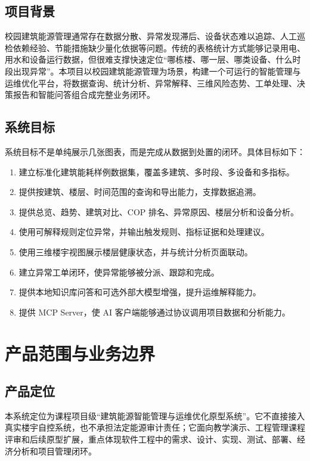 \documentclass[12pt,a4paper]{ctexart}
\begin{document}
\subsection{项目背景}
校园建筑能源管理通常存在数据分散、异常发现滞后、设备状态难以追踪、人工巡检依赖经验、节能措施缺少量化依据等问题。传统的表格统计方式能够记录用电、用水和设备运行数据，但很难支撑快速定位“哪栋楼、哪一层、哪类设备、什么时段出现异常”。本项目以校园建筑能源管理为场景，构建一个可运行的智能管理与运维优化平台，将数据查询、统计分析、异常解释、三维风险态势、工单处理、决策报告和智能问答组合成完整业务闭环。

\subsection{系统目标}
系统目标不是单纯展示几张图表，而是完成从数据到处置的闭环。具体目标如下：
\begin{enumerate}
    \item 建立标准化建筑能耗样例数据集，覆盖多建筑、多时段、多设备和多指标。
    \item 提供按建筑、楼层、时间范围的查询和导出能力，支撑数据追溯。
    \item 提供总览、趋势、建筑对比、COP 排名、异常原因、楼层分析和设备分析。
    \item 使用可解释规则定位异常，并输出触发规则、指标证据和处理建议。
    \item 使用三维楼宇视图展示楼层健康状态，并与统计分析页面联动。
    \item 建立异常工单闭环，使异常能够被分派、跟踪和完成。
    \item 提供本地知识库问答和可选外部大模型增强，提升运维解释能力。
    \item 提供 MCP Server，使 AI 客户端能够通过协议调用项目数据和分析能力。
\end{enumerate}

\section{产品范围与业务边界}
\subsection{产品定位}
本系统定位为课程项目级“建筑能源智能管理与运维优化原型系统”。它不直接接入真实楼宇自控系统，也不承担法定能源审计责任；它面向教学演示、工程管理课程评审和后续原型扩展，重点体现软件工程中的需求、设计、实现、测试、部署、经济分析和项目管理闭环。
\end{document}
